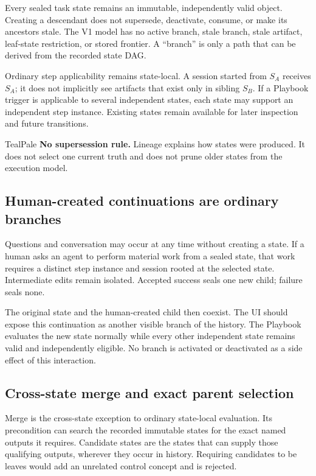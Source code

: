 \documentclass[11pt]{article}
\begin{document}
Every sealed task state remains an immutable, independently valid object. Creating a descendant does not supersede, deactivate, consume, or make its ancestors stale. The V1 model has no active branch, stale branch, stale artifact, leaf-state restriction, or stored frontier. A ``branch'' is only a path that can be derived from the recorded state DAG.

Ordinary step applicability remains state-local. A session started from \(S_A\) receives \(S_A\); it does not implicitly see artifacts that exist only in sibling \(S_B\). If a Playbook trigger is applicable to several independent states, each state may support an independent step instance. Existing states remain available for later inspection and future transitions.

\begin{decisionbox}{TealPale}
\textbf{No supersession rule.} Lineage explains how states were produced. It does not select one current truth and does not prune older states from the execution model.
\end{decisionbox}

\subsection{Human-created continuations are ordinary branches}

Questions and conversation may occur at any time without creating a state. If a human asks an agent to perform material work from a sealed state, that work requires a distinct step instance and session rooted at the selected state. Intermediate edits remain isolated. Accepted success seals one new child; failure seals none.

The original state and the human-created child then coexist. The UI should expose this continuation as another visible branch of the history. The Playbook evaluates the new state normally while every other independent state remains valid and independently eligible. No branch is activated or deactivated as a side effect of this interaction.

\subsection{Cross-state merge and exact parent selection}

Merge is the cross-state exception to ordinary state-local evaluation. Its precondition can search the recorded immutable states for the exact named outputs it requires. Candidate states are the states that can supply those qualifying outputs, wherever they occur in history. Requiring candidates to be leaves would add an unrelated control concept and is rejected.
\end{document}
